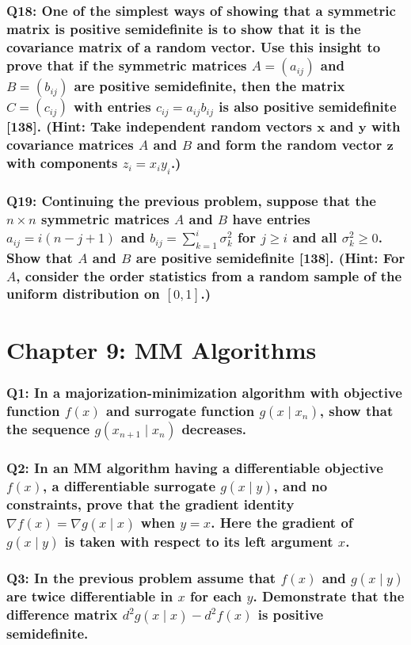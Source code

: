 \documentclass{article}
\begin{document}
\subsubsection*{Q18: One of the simplest ways of showing that a symmetric matrix is positive semidefinite is to show that it is the covariance matrix of a random vector. Use this insight to prove that if the symmetric matrices \(A = (a_{ij})\) and \(B = (b_{ij})\) are positive semidefinite, then the matrix \(C = (c_{ij})\) with entries \(c_{ij} = a_{ij} b_{ij}\) is also positive semidefinite [138]. (Hint: Take independent random vectors \(\mathbf{x}\) and \(\mathbf{y}\) with covariance matrices \(A\) and \(B\) and form the random vector \(\mathbf{z}\) with components \(z_i = x_i y_i\).)}

\subsubsection*{Q19: Continuing the previous problem, suppose that the \(n \times n\) symmetric matrices \(A\) and \(B\) have entries \(a_{ij} = i(n - j + 1)\) and \(b_{ij} = \sum_{k=1}^i \sigma_k^2\) for \(j \geq i\) and all \(\sigma_k^2 \geq 0\). Show that \(A\) and \(B\) are positive semidefinite [138]. (Hint: For \(A\), consider the order statistics from a random sample of the uniform distribution on \([0, 1]\).)}

\newpage
\section*{Chapter 9: MM Algorithms}
\subsubsection*{Q1: In a majorization-minimization algorithm with objective function \(f(x)\) and surrogate function \(g(x \mid x_n)\), show that the sequence \(g(x_{n+1} \mid x_n)\) decreases.}

\subsubsection*{Q2: In an MM algorithm having a differentiable objective \(f(x)\), a differentiable surrogate \(g(x \mid y)\), and no constraints, prove that the gradient identity \(\nabla f(x) = \nabla g(x \mid x)\) when \(y = x\). Here the gradient of \(g(x \mid y)\) is taken with respect to its left argument \(x\).}

\subsubsection*{Q3: In the previous problem assume that \(f(x)\) and \(g(x \mid y)\) are twice differentiable in \(x\) for each \(y\). Demonstrate that the difference matrix \(d^2 g(x \mid x) - d^2 f(x)\) is positive semidefinite.}
\end{document}
